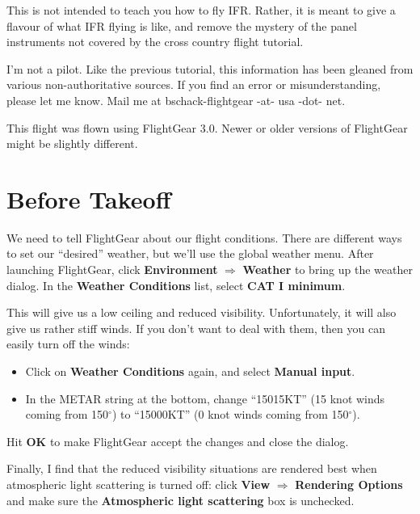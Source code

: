 This is not intended to teach you how to fly IFR.  Rather, it is meant
to give a flavour of what IFR flying is like, and remove the mystery
of the panel instruments not covered by the cross country flight
tutorial.

I'm not a pilot.  Like the previous tutorial, this information has
been gleaned from various non-authoritative sources.  If you find an
error or misunderstanding, please let me know.  Mail me at
bschack-flightgear -at- usa -dot- net.

This flight was flown using FlightGear 3.0.  Newer or older versions
of FlightGear might be slightly different.

\section{Before Takeoff}

We need to tell FlightGear about our flight conditions.  There are
different ways to set our ``desired'' weather, but we'll use the
global weather menu.  After launching FlightGear, click
\textbf{\textsf{Environment}} $\Rightarrow$ \textbf{\textsf{Weather}}
to bring up the weather dialog.  In the \textbf{\textsf{Weather
    Conditions}} list, select \textbf{\textsf{CAT I minimum}}.

This will give us a low ceiling and reduced visibility.
Unfortunately, it will also give us rather stiff winds.  If you don't
want to deal with them, then you can easily turn off the winds:

\begin{itemize}
\item Click on \textbf{\textsf{Weather Conditions}} again, and select
  \textbf{\textsf{Manual input}}.
\item In the METAR string at the bottom, change ``15015KT'' (15 knot
  winds coming from 150$^\circ$) to ``15000KT'' (0 knot winds coming
  from 150$^\circ$).
\end{itemize}

Hit \textbf{\textsf{OK}} to make FlightGear accept the changes and
close the dialog.  

Finally, I find that the reduced visibility situations are rendered
best when atmospheric light scattering is turned off: click
\textbf{\textsf{View}} $\Rightarrow$ \textbf{\textsf{Rendering
    Options}} and make sure the \textbf{\textsf{Atmospheric light
    scattering}} box is unchecked.



